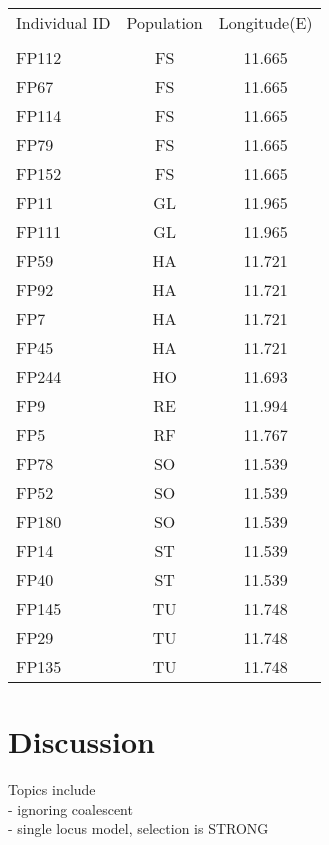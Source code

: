 \documentclass[12pt]{article}
\begin{document}
\begin{table}
\begin{tabular}{l|c|c}
Individual ID  & Population \citep{Turner2011} & Longitude(E)\\
\citep{Turner2014}& \citep{Turner2011}&\\
\hline
FP112 & FS&11.665\\
FP67 & FS &11.665\\
FP114 & FS &11.665\\
FP79 & FS &11.665\\
FP152 &  FS &11.665\\
FP11 & GL &11.965\\
FP111&GL &11.965\\
FP59 & HA  &11.721\\
FP92 & HA &11.721\\
FP7 &  HA  & 11.721\\
FP45 & HA&11.721\\
FP244& HO &11.693\\
FP9&   RE&11.994\\
FP5 &  RF&11.767\\
FP78 &  SO &11.539\\
FP52 &  SO &11.539\\
FP180& SO &11.539\\
FP14 & ST&11.539\\
FP40 & ST&11.539\\
FP145 & TU&11.748\\
FP29&  TU&11.748\\
FP135& TU&11.748\\

\end{tabular}
\end{table}

\section{Discussion}
Topics include\\
- ignoring coalescent\\
- single locus model, selection is STRONG



\end{document}
